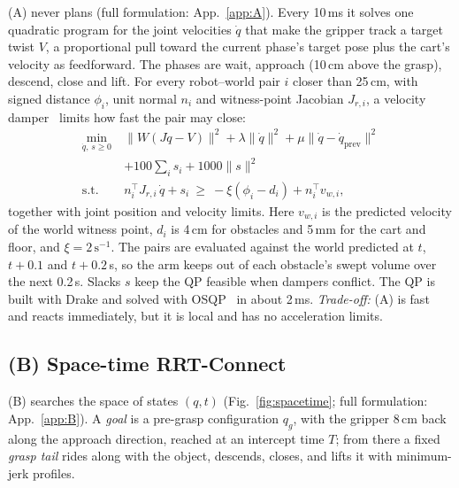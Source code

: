 \documentclass[conference]{IEEEtran}
\begin{document}
(A) never plans (full formulation: App.~\ref{app:A}). Every 10\,ms it solves one quadratic program for the joint velocities $\dot q$ that
make the gripper track a target twist $V$, a proportional pull toward the current phase's target pose
plus the cart's velocity as feedforward. The phases are wait, approach (10\,cm above the grasp), descend,
close and lift. For every robot--world pair $i$ closer than 25\,cm, with signed distance $\phi_i$, unit
normal $n_i$ and witness-point Jacobian $J_{r,i}$, a velocity damper~\cite{faverjon1987local,haviland2021neo}
limits how fast the pair may close:
\begin{equation}
\begin{aligned}
\min_{\dot q,\, s\ge0}\ & \lVert W(J\dot q - V)\rVert^2 + \lambda\lVert\dot q\rVert^2 + \mu\lVert\dot q-\dot q_{\text{prev}}\rVert^2\\
& + 100\textstyle\sum_i s_i + 1000\lVert s\rVert^2\\
\text{s.t.}\ & n_i^\top J_{r,i}\,\dot q + s_i \ \ge\ -\xi(\phi_i - d_i) + n_i^\top v_{w,i},
\end{aligned}
\label{eq:qp}
\end{equation}
together with joint position and velocity limits. Here $v_{w,i}$ is the predicted velocity of the world
witness point, $d_i$ is 4\,cm for obstacles and 5\,mm for the cart and floor, and $\xi=2\,\text{s}^{-1}$.
The pairs are evaluated against the world predicted at $t$, $t+0.1$ and $t+0.2$\,s, so the arm keeps out
of each obstacle's swept volume over the next 0.2\,s. Slacks $s$ keep the QP feasible when dampers
conflict. The QP is built with Drake and solved with OSQP~\cite{stellato2020osqp} in about 2\,ms.
\emph{Trade-off:} (A) is fast and reacts immediately, but it is local and has no acceleration limits.

\subsection{(B) Space-time RRT-Connect}

(B) searches the space of states $(q, t)$ (Fig.~\ref{fig:spacetime}; full formulation: App.~\ref{app:B}). A \emph{goal} is a pre-grasp
configuration $q_g$, with the gripper 8\,cm back along the approach direction, reached at an intercept
time $T$; from there a fixed \emph{grasp tail} rides along with the object, descends, closes, and lifts
it with minimum-jerk profiles.
\end{document}
